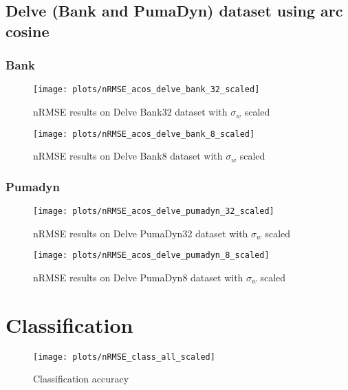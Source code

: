 \subsection{Delve (Bank and PumaDyn) dataset using arc cosine}


\subsubsection{Bank}

\begin{figure}[H]
    \texttt{[image: plots/nRMSE\_acos\_delve\_bank\_32\_scaled]}
    \caption{nRMSE results on Delve Bank32 dataset with $\sigma_w$ scaled}
    \label{fig:nrmse-acos-delve-bank-32-scaled}
\end{figure}

\begin{figure}[H]
    \texttt{[image: plots/nRMSE\_acos\_delve\_bank\_8\_scaled]}
    \caption{nRMSE results on Delve Bank8 dataset with $\sigma_w$ scaled}
    \label{fig:nrmse-acos-delve-bank-8-scaled}
\end{figure}

\subsubsection{Pumadyn}

\begin{figure}[H]
    \texttt{[image: plots/nRMSE\_acos\_delve\_pumadyn\_32\_scaled]}
    \caption{nRMSE results on Delve PumaDyn32 dataset with $\sigma_w$ scaled}
    \label{fig:nrmse-acos-delve-pumadyn-32-scaled}
\end{figure}

\begin{figure}[H]
    \texttt{[image: plots/nRMSE\_acos\_delve\_pumadyn\_8\_scaled]}
    \caption{nRMSE results on Delve PumaDyn8 dataset with $\sigma_w$ scaled}
    \label{fig:nrmse-acos-delve-pumadyn-8-scaled}
\end{figure}

\section{Classification}

\begin{figure}[H]
    \texttt{[image: plots/nRMSE\_class\_all\_scaled]}
    \caption{Classification accuracy}
    \label{fig:nrmse-class-all}
\end{figure}

